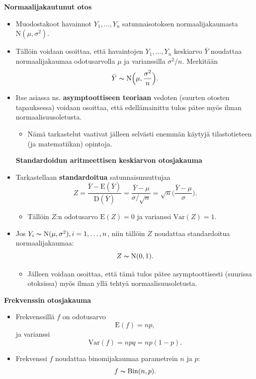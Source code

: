 \documentclass[
]{book}
\providecommand{\tightlist}{%
  \setlength{\itemsep}{0pt}\setlength{\parskip}{0pt}}
\begin{document}
\textbf{Normaalijakautunut otos}

\begin{itemize}
\item
  Muodostakoot havainnot \(Y_1, \ldots, Y_n\) satunnaisotoksen normaalijakaumasta \(\text{N}(\mu, \sigma^2)\).
\item
  Tällöin voidaan osoittaa, että havaintojen \(Y_1, \ldots, Y_n\) keskiarvo \(\bar{Y}\) noudattaa normaalijakaumaa odotusarvolla \(\mu\) ja varianssilla \(\sigma^2/n\). Merkitään
  \[
  \bar{Y} \thicksim \text{N} \Big(\mu, \frac{\sigma^2}{n} \Big).
  \]
\item
  Itse asiassa ns. \textbf{asymptoottiseen teoriaan} vedoten (suurten otosten tapauksessa) voidaan osoittaa, että edellämainittu tulos pätee myös ilman normaalisuusoletusta.

  \begin{itemize}
  \tightlist
  \item
    Nämä tarkastelut vaativat jälleen selvästi enemmän käytyjä tilastotieteen (ja matematiikan) opintoja.
  \end{itemize}

  \textbf{Standardoidun aritmeettisen keskiarvon otosjakauma}
\item
  Tarkastellaan \textbf{standardoitua} satunnaismuuttujaa
  \[
  Z = \frac{\bar{Y} - \text{E}(\bar{Y})}{\text{D}(\bar{Y})} = \frac{\bar{Y} - \mu}{\sigma / \sqrt{n}} = \sqrt{n} \Big(\frac{\bar{Y} - \mu}{\sigma}\Big).
  \]

  \begin{itemize}
  \tightlist
  \item
    Tällöin \(Z\):n odotusarvo \(\text{E}(Z) = 0\) ja varianssi \(\mathrm{Var}(Z) = 1\).
  \end{itemize}
\item
  Jos \(Y_i \thicksim \text{N}(\mu, \sigma^2), i=1,\ldots,n\), niin tällöin \(Z\) noudattaa standardoitua normaalijakaumaa:
  \[
  Z \thicksim \text{N}(0,1).
  \]

  \begin{itemize}
  \tightlist
  \item
    Jälleen voidaan osoittaa, että tämä tulos pätee asymptoottisesti (suurissa otoksissa) myös ilman yllä tehtyä normaalisuusoletusta.
  \end{itemize}
\end{itemize}

\textbf{Frekvenssin otosjakauma}

\begin{itemize}
\tightlist
\item
  Frekvenssillä \(f\) on odotusarvo
  \[
  \text{E}(f) = np,
  \]
  ja varianssi
  \[
  \mathrm{Var}(f) = npq = np(1-p).
  \]
\item
  Frekvenssi \(f\) noudattaa binomijakaumaa parametrein \(n\) ja \(p\):
  \[
  f \thicksim \mathrm{Bin}(n,p).
  \]
\end{itemize}
\end{document}
